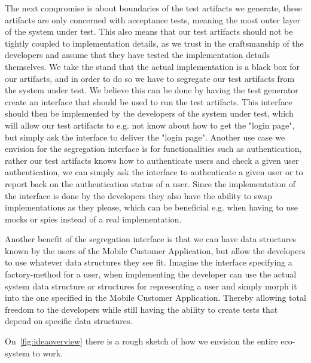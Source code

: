 The next compromise is about boundaries of the test artifacts we generate, these artifacts are only concerned with acceptance tests, meaning the most outer layer of the system under test. 
This also means that our test artifacts should not be tightly coupled to implementation details, as we trust in the craftsmanship of the developers and assume that they have tested the implementation details themselves.
We take the stand that the actual implementation is a black box for our artifacts, and in order to do so we have to segregate our test artifacts from the system under test.
We believe this can be done by having the test generator create an interface that should be used to run the test artifacts.
This interface should then be implemented by the developers of the system under test, which will allow our test artifacts to e.g. not know about how to get the "login page", but simply ask the interface to deliver the "login page".
Another use case we envision for the segregation interface is for functionalities such as authentication, rather our test artifacts knows how to authenticate users and check a given user authentication, we can simply ask the interface to authenticate a given user or to report back on the authentication status of a user.
Since the implementation of the interface is done by the developers they also have the ability to swap implementations as they please, which can be beneficial e.g. when having to use mocks or spies instead of a real implementation.

Another benefit of the segregation interface is that we can have data structures known by the users of the Mobile Customer Application, but allow the developers to use whatever data structures they see fit. Imagine the interface specifying a factory-method for a user, when implementing the developer can use the actual system data structure or structures for representing a user and simply morph it into the one specified in the Mobile Customer Application. Thereby allowing total freedom to the developers while still having the ability to create tests that depend on specific data structures.

On~\autoref{fig:ideaoverview} there is a rough sketch of how we envision the entire eco-system to work.

